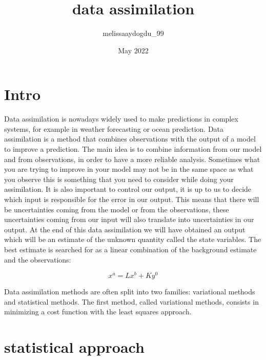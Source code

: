 \documentclass{article}
\title{data assimilation}
\author{melissaaydogdu_99 }
\date{May 2022}
\begin{document}
\section{Intro}
\noindent Data assimilation is nowadays widely used to make predictions in complex systems, for example in weather forecasting or ocean prediction. Data assimilation is a method that combines observations with the output of a model to improve a prediction. 
The main idea is to combine information from our model and from observations, in order to have a more reliable analysis. Sometimes what you are trying to improve in your model may not be in the same space as what you observe this is something that you need to consider while doing your assimilation. It is also important to control our output, it is up to us to decide which input is responsible for the error in our output. This means that there will be uncertainties coming from the model or from the observations, these uncertainties coming from our input will also translate into uncertainties in our output.
At the end of this data assimilation we will have obtained an output which will be an estimate of the unknown quantity called the state variables.
The best estimate is searched for as a linear combination of the background estimate and the observations:

$$x^a=Lx^b+Ky^0$$


\noindent Data assimilation methods are often split into two families: variational methods and statistical methods.
The first method, called variational methods, consists in minimizing a cost function with the least squares approach. 
\section{statistical approach}
\end{document}
